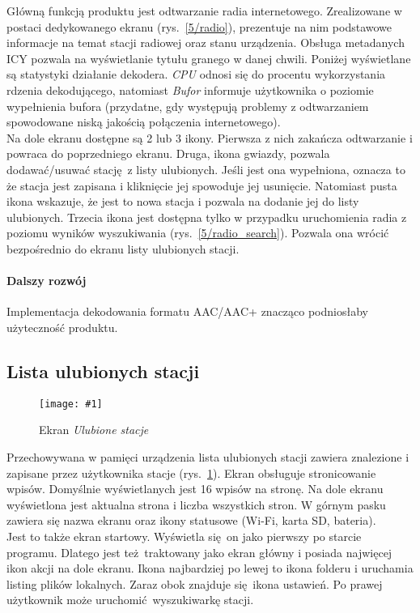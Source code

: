 \documentclass[polish]{aghengthesis}
\newcommand{\imgint}[4]{
	\begin{figure}[{#4}]
		\centering
		\texttt{[image: \#1]}
		\caption{#2}
		\label{#1}
	\end{figure}
}
\newcommand{\imgh}[3]{\imgint{#1}{#2}{#3}{H}}
\begin{document}
			Główną funkcją produktu jest odtwarzanie radia internetowego. Zrealizowane w postaci dedykowanego ekranu (rys.~\ref{5/radio}), prezentuje na nim podstawowe informacje na temat stacji radiowej oraz stanu urządzenia. Obsługa metadanych ICY pozwala na wyświetlanie tytułu granego w danej chwili. Poniżej wyświetlane są statystyki działanie dekodera. \textit{CPU} odnosi się do procentu wykorzystania rdzenia dekodującego, natomiast \textit{Bufor} informuje użytkownika o poziomie wypełnienia bufora (przydatne, gdy występują problemy z odtwarzaniem spowodowane niską jakością połączenia internetowego).
			$ $\\
			
			Na dole ekranu dostępne są 2 lub 3 ikony. Pierwsza z nich zakańcza odtwarzanie i powraca do poprzedniego ekranu. Druga, ikona gwiazdy, pozwala dodawać/usuwać stację z listy ulubionych. Jeśli jest ona wypełniona, oznacza to że stacja jest zapisana i kliknięcie jej spowoduje jej usunięcie. Natomiast pusta ikona wskazuje, że jest to nowa stacja i pozwala na dodanie jej do listy ulubionych. Trzecia ikona jest dostępna tylko w przypadku uruchomienia radia z poziomu wyników wyszukiwania (rys.~\ref{5/radio_search}). Pozwala ona wrócić bezpośrednio do ekranu listy ulubionych stacji.
		
			\paragraph{Dalszy rozwój}
				Implementacja dekodowania formatu AAC/AAC+ znacząco podniosłaby użyteczność produktu.
			
		\subsection{Lista ulubionych stacji}
			\imgh{5/fav}{Ekran \textit{Ulubione stacje}}{0.5}
			Przechowywana w pamięci urządzenia lista ulubionych stacji zawiera znalezione i zapisane przez użytkownika stacje (rys.~\ref{5/fav}).
			Ekran obsługuje stronicowanie wpisów. Domyślnie wyświetlanych jest 16 wpisów na stronę. Na dole ekranu wyświetlona jest aktualna strona i liczba wszystkich stron.
			W górnym pasku zawiera się nazwa ekranu oraz ikony statusowe (Wi-Fi, karta SD, bateria).
			$ $\\
			
			Jest to także ekran startowy. Wyświetla się on jako pierwszy po starcie programu. Dlatego jest też traktowany jako ekran główny i posiada najwięcej ikon akcji na dole ekranu.
			Ikona najbardziej po lewej to ikona folderu i uruchamia listing plików lokalnych. Zaraz obok znajduje się ikona ustawień. Po prawej użytkownik może uruchomić wyszukiwarkę stacji.
			
\end{document}

